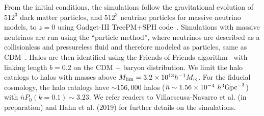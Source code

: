 From the initial conditions, the simulations follow the gravitational evolution 
of $512^3$ dark matter particles, and $512^3$ neutrino particles for massive 
neutrino models, to $z=0$ using {\sc Gadget-III} TreePM+SPH code~\citep{springel2005}. 
Simulations with massive neutrinos are run using the ``particle method'', 
where neutrinos are described as a collisionless and pressureless fluid 
and therefore modeled as particles, same as CDM~\citep{brandbyge2008,viel2010}.
Halos are then identified using the Friends-of-Friends algorithm~\citep[FoF;][]{davis1985} 
with linking length $b=0.2$ on the CDM + baryon distribution. We limit 
the halo catalogs to halos with masses above 
$M_{\rm lim} = 3.2\times 10^{13} h^{-1}M_\odot$.
For the fiducial cosmology, the halo catalogs have ${\sim}156,000$ halos 
($\bar{n} \sim 1.56 \times 10^{-4}~h^3{\rm Gpc}^{-3}$) with $\bar{n} P_0(k=0.1)\sim 3.23$. 
We refer readers to Villaescusa-Navarro et al. (in preparation) and Hahn et al. (2019) 
for further details on the \quij simulations.
